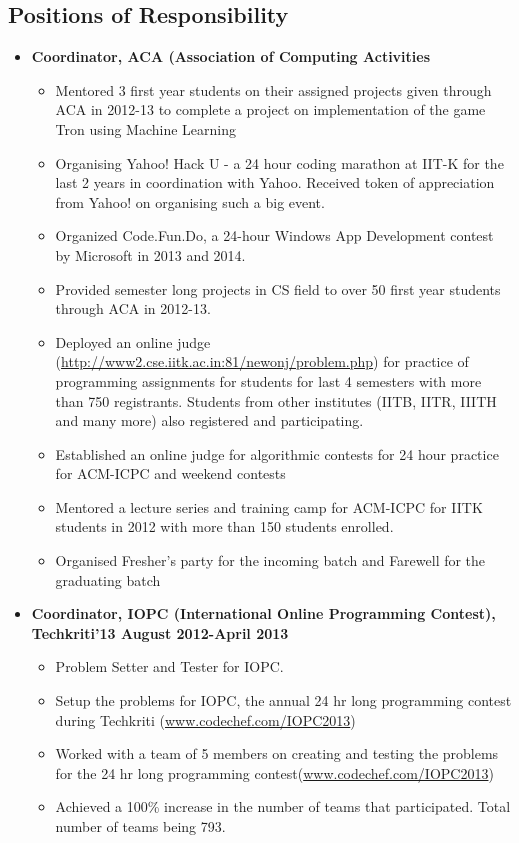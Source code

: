 \documentclass[margin,line]{resume}
\begin{document}
\begin{resume}
  \section{\mysidestyle Positions of Responsibility}

  \begin{itemize}

  \item  \textbf{\textsf{Coordinator, ACA (Association of Computing Activities}}
    \begin{itemize}
      \item Mentored 3 first year students on their assigned projects given through ACA in 2012-13 to complete a project on implementation of the game Tron using Machine Learning
      \item Organising Yahoo! Hack U - a 24 hour coding marathon at IIT-K for the last 2 years in coordination with Yahoo. Received token of appreciation from Yahoo! on organising such a big event.
      \item Organized Code.Fun.Do, a 24-hour Windows App Development contest by Microsoft in 2013 and 2014.
      \item Provided semester long projects in CS field to over 50 first year students through ACA in 2012-13.
      \item Deployed an online judge (\url{http://www2.cse.iitk.ac.in:81/newonj/problem.php}) for practice of programming assignments for students for last 4 semesters with more than 750 registrants. Students from other institutes (IITB, IITR, IIITH and many more) also registered and participating.
      \item Established an online judge for algorithmic contests for 24 hour practice for ACM-ICPC and weekend contests
      \item Mentored a lecture series and training camp for ACM-ICPC for IITK students in 2012 with more than 150 students enrolled.
      \item Organised Fresher’s party for the incoming batch and Farewell for the graduating batch
    \end{itemize}

  \item  \textbf{\textsf{Coordinator, IOPC (International Online Programming Contest), Techkriti'13 August 2012-April 2013}}
    \begin{itemize}
    \item Problem Setter and Tester for IOPC.
    \item Setup the problems for IOPC, the annual 24 hr long programming contest during Techkriti (\url{www.codechef.com/IOPC2013})
    \item Worked with a team of 5 members on creating and testing the problems for the 24 hr long programming contest(\url{www.codechef.com/IOPC2013})
    \item Achieved a 100\% increase in the number of teams that participated. Total number of teams being 793.
    \end{itemize}
    

\end{itemize}
\end{resume}
\end{document}
